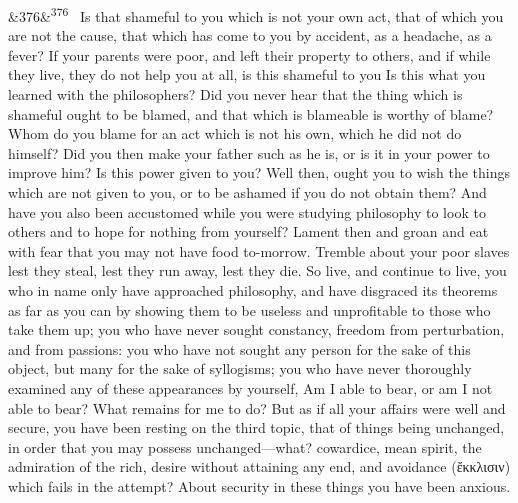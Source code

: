 \documentclass[12pt]{article}
\newcommand{\para}[1][]{\par\noindent\ifx&#1&\else\textsuperscript{\footnotesize #1}~\fi}
\begin{document}
\para[376] Is that shameful to you which is not your own act, that of which you are not the cause, that which has come to you by accident, as a headache, as a fever? If your parents were poor, and left their property to others, and if while they live, they do not help you at all, is this shameful to you Is this what you learned with the philosophers? Did you never hear that the thing which is shameful ought to be blamed, and that which is blameable is worthy of blame? Whom do you blame for an act which is not his own, which he did not do himself? Did you then make your father such as he is, or is it in your power to improve him? Is this power given to you? Well then, ought you to wish the things which are not given to you, or to be ashamed if you do not obtain them? And have you also been accustomed while you were studying philosophy to look to others and to hope for nothing from yourself? Lament then and groan and eat with fear that you may not have food to-morrow. Tremble about your poor slaves lest they steal, lest they run away, lest they die. So live, and continue to live, you who in name only have approached philosophy, and have disgraced its theorems as far as you can by showing them to be useless and unprofitable to those who take them up; you who have never sought constancy, freedom from perturbation, and from passions: you who have not sought any person for the sake of this object, but many for the sake of syllogisms; you who have never thoroughly examined any of these appearances by yourself, Am I able to bear, or am I not able to bear? What remains for me to do? But as if all your affairs were well and secure, you have been resting on the third topic, that of things being unchanged, in order that you may possess unchanged—what? cowardice, mean spirit, the admiration of the rich, desire without attaining any end, and avoidance (ἔκκλισιν) which fails in the attempt? About security in these things you have been anxious.
\end{document}
